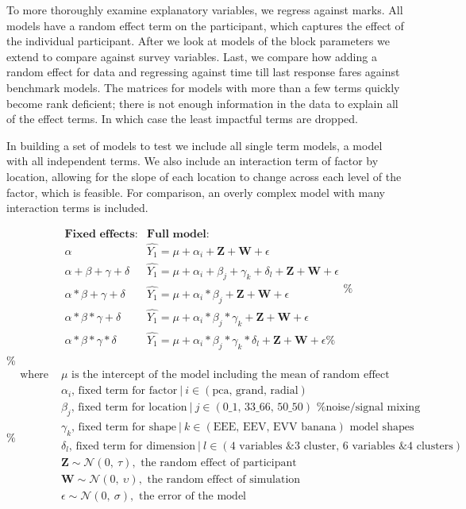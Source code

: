 \documentclass{template/monashthesis}
\begin{document}
To more thoroughly examine explanatory variables, we regress against marks. All models have a random effect term on the participant, which captures the effect of the individual participant. After we look at models of the block parameters we extend to compare against survey variables. Last, we compare how adding a random effect for data and regressing against time till last response fares against benchmark models. The matrices for models with more than a few terms quickly become rank deficient; there is not enough information in the data to explain all of the effect terms. In which case the least impactful terms are dropped.

In building a set of models to test we include all single term models, a model with all independent terms. We also include an interaction term of factor by location, allowing for the slope of each location to change across each level of the factor, which is feasible. For comparison, an overly complex model with many interaction terms is included.

\[
\begin{array}{ll}
\textbf{Fixed effects:}          &\textbf{Full model:} \\
\alpha                           &\widehat{Y_1} = \mu + \alpha_i + \textbf{Z} + \textbf{W} + \epsilon \\
\alpha + \beta + \gamma + \delta &\widehat{Y_1} = \mu + \alpha_i + \beta_j + \gamma_k + \delta_l + \textbf{Z} + \textbf{W} + \epsilon \\
\alpha * \beta + \gamma + \delta &\widehat{Y_1} = \mu + \alpha_i * \beta_j + \textbf{Z} + \textbf{W} + \epsilon \\
\alpha * \beta * \gamma + \delta &\widehat{Y_1} = \mu + \alpha_i * \beta_j * \gamma_k + \textbf{Z} + \textbf{W} + \epsilon \\
\alpha * \beta * \gamma * \delta &\widehat{Y_1} = \mu + \alpha_i * \beta_j * \gamma_k * \delta_l + \textbf{Z} + \textbf{W} + \epsilon
\% \end{array}
\% \]
\% \[
\% \begin{array}{ll}
\text{where } &\mu \text{ is the intercept of the model including the mean of random effect} \\
&\alpha_i \text{, fixed term for factor}~|~i\in (\text{pca, grand, radial}) \\
&\beta_j  \text{, fixed term for location}~|~j\in (\text{0\_1, 33\_66, 50\_50}) \text{ \% noise/signal mixing} \\
&\gamma_k \text{, fixed term for shape}~|~k\in (\text{EEE, EEV, EVV banana}) \text{ model shapes} \\
&\delta_l \text{, fixed term for dimension}~|~l\in (\text{4 variables \& 3 cluster, 6 variables \& 4 clusters}) \\
&\textbf{Z} \sim \mathcal{N}(0,~\tau), \text{ the random effect of participant} \\
&\textbf{W} \sim \mathcal{N}(0,~\upsilon), \text{ the random effect of simulation} \\
&\epsilon   \sim \mathcal{N}(0,~\sigma), \text{ the error of the model} \\
\end{array}
\]
\end{document}
